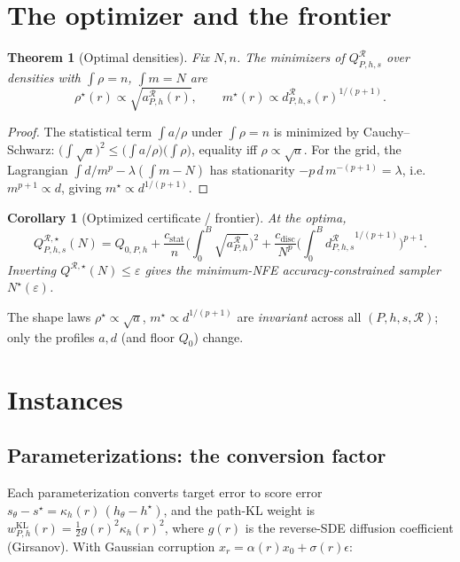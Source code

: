 \documentclass[11pt]{article}
\newtheorem{theorem}{Theorem}
\newtheorem{corollary}{Corollary}
\newcommand{\R}{\mathcal R}
\begin{document}
\section{The optimizer and the frontier}
\label{sec:optimizer}

\begin{theorem}[Optimal densities]\label{thm:opt}
Fix $N,n$. The minimizers of $Q_{P,h,s}^\R$ over densities with
$\int\rho=n$, $\int m=N$ are
\[
\rho^\star(r)\propto\sqrt{a_{P,h}^\R(r)},
\qquad
m^\star(r)\propto d_{P,h,s}^\R(r)^{1/(p+1)} .
\]
\end{theorem}
\begin{proof}
The statistical term $\int a/\rho$ under $\int\rho=n$ is minimized by
Cauchy--Schwarz: $\big(\int\sqrt a\big)^2\le \big(\int a/\rho\big)\big(\int\rho\big)$,
equality iff $\rho\propto\sqrt a$. For the grid, the Lagrangian
$\int d/m^p-\lambda(\int m-N)$ has stationarity
$-p\,d\,m^{-(p+1)}=\lambda$, i.e.\ $m^{p+1}\propto d$, giving
$m^\star\propto d^{1/(p+1)}$.
\end{proof}

\begin{corollary}[Optimized certificate / frontier]\label{cor:frontier}
At the optima,
\[
Q^{\R,\star}_{P,h,s}(N)=Q_{0,P,h}
+\frac{c_{\mathrm{stat}}}{n}\Big(\int_0^B\!\sqrt{a_{P,h}^\R}\Big)^2
+\frac{c_{\mathrm{disc}}}{N^{p}}\Big(\int_0^B\!{d_{P,h,s}^\R}^{1/(p+1)}\Big)^{p+1}.
\]
Inverting $Q^{\R,\star}(N)\le\varepsilon$ gives the minimum-NFE
accuracy-constrained sampler $N^\star(\varepsilon)$.
\end{corollary}

\noindent The shape laws $\rho^\star\propto\sqrt a$,
$m^\star\propto d^{1/(p+1)}$ are \emph{invariant} across all
$(P,h,s,\R)$; only the profiles $a,d$ (and floor $Q_0$) change.

\section{Instances}
\label{sec:instances}

\subsection{Parameterizations: the conversion factor}
\label{sec:params}

Each parameterization converts target error to score error
$s_\theta-s^\star=\kappa_h(r)\,(h_\theta-h^\star)$, and the path-KL weight
is $w^{\mathrm{KL}}_{P,h}(r)=\tfrac12 g(r)^2\kappa_h(r)^2$, where $g(r)$ is
the reverse-SDE diffusion coefficient (Girsanov). With Gaussian
corruption $x_r=\alpha(r)x_0+\sigma(r)\epsilon$:
\end{document}
